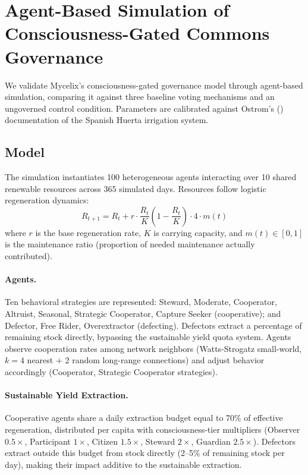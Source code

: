 \section{Agent-Based Simulation of Consciousness-Gated Commons Governance}
\label{sec:simulations}

We validate Mycelix's consciousness-gated governance model through agent-based simulation,
comparing it against three baseline voting mechanisms and an ungoverned control condition.
Parameters are calibrated against Ostrom's (\citeyear{ostrom1990}) documentation of the
Spanish Huerta irrigation system.

\subsection{Model}

The simulation instantiates 100 heterogeneous agents interacting over 10 shared renewable
resources across 365 simulated days. Resources follow logistic regeneration dynamics:
\begin{equation}
  R_{t+1} = R_t + r \cdot \frac{R_t}{K}\left(1 - \frac{R_t}{K}\right) \cdot 4 \cdot m(t)
  \label{eq:regen}
\end{equation}
where $r$ is the base regeneration rate, $K$ is carrying capacity, and $m(t) \in [0,1]$ is
the maintenance ratio (proportion of needed maintenance actually contributed).

\paragraph{Agents.}
Ten behavioral strategies are represented: Steward, Moderate, Cooperator, Altruist,
Seasonal, Strategic Cooperator, Capture Seeker (cooperative); and Defector, Free Rider,
Overextractor (defecting). Defectors extract a percentage of remaining stock directly,
bypassing the sustainable yield quota system. Agents observe cooperation rates among
network neighbors (Watts-Strogatz small-world, $k=4$ nearest $+$ 2 random long-range
connections) and adjust behavior accordingly (Cooperator, Strategic Cooperator strategies).

\paragraph{Sustainable Yield Extraction.}
Cooperative agents share a daily extraction budget equal to 70\% of effective regeneration,
distributed per capita with consciousness-tier multipliers (Observer $0.5\times$,
Participant $1\times$, Citizen $1.5\times$, Steward $2\times$, Guardian $2.5\times$).
Defectors extract outside this budget from stock directly (2--5\% of remaining stock
per day), making their impact additive to the sustainable extraction.

